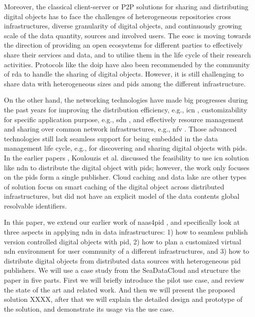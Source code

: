 \documentclass[conference]{IEEEtran}
\begin{document}
Moreover, the classical client-server or P2P solutions for sharing and distributing digital objects has to face the challenges of heterogeneous repositories cross infrastructures, diverse granularity of digital objects, and continuously growing scale of the data quantity, sources and involved users. The \gls{eosc} is moving towards the direction of providing an open ecosystems for different parties to effectively share their services and data, and to utilise them in the life cycle of their research activities. Protocols like the \gls{doip} have also been recommended by the community of \gls{rda} to handle the sharing of digital objects. However, it is still challenging to share data with heterogeneous sizes and \glspl{pid} among the different infrastructure.

On the other hand, the networking technologies have made big progresses during the past years for improving the distribution efficiency, e.g., \gls{icn} \cite{zhang2014named}, customizability for specific application purpose, e.g., \gls{sdn} \cite{kreutz2014software}, and effectively resource management and sharing over common network infrastructures, e.g., \gls{nfv} \cite{han2015network}. Those advanced technologies still lack seamless support for being embedded in the data management life cycle, e.g., for discovering and sharing digital objects with \glspl{pid}. In the earlier papers \cite{koulouzis2018information}, Koulouzis et al. discussed the feasibility to use \gls{icn} solution like \gls{ndn} to distribute the digital object with \glspl{pid}; however, the work only focuses on the \glspl{pid} form a single publisher. Cloud caching \cite{} and data lake \cite{} are other types of solution focus on smart caching of the digital object across distributed infrastructures, but did not have an explicit model of the data contents global resolvable identifiers.

In this paper, we extend our earlier work of \gls{naas4pid} \cite{koulouzis2018information}, and specifically look at three aspects in applying \gls{ndn} in data infrastructures: 1) how to seamless publish version controlled digital objects with \gls{pid}, 2) how to plan a customized virtual \gls{ndn} environment for user community of a different infrastructures, and 3) how to distribute digital objects from distributed data sources with heterogeneous \gls{pid} publishers. We will use a case study from the SeaDataCloud and structure the paper in five parts. First we will briefly introduce the pilot use case, and review the state of the art and related work. And then we will present the proposed solution XXXX, after that we will explain the detailed design and prototype of the solution, and demonstrate its usage via the use case.
\end{document}
